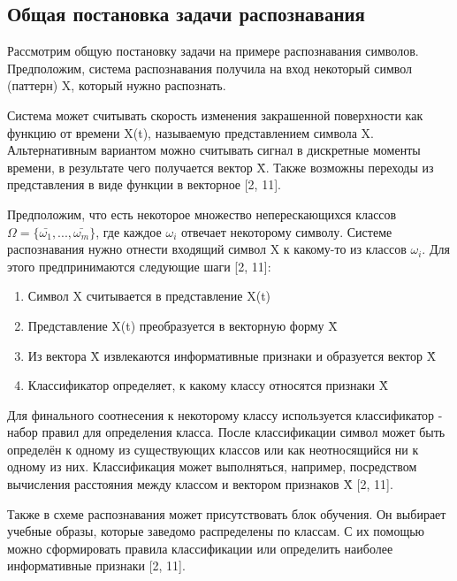 \documentclass[12pt,a4paper]{article}
\begin{document}
\subsection{Общая постановка задачи распознавания}
Рассмотрим общую постановку задачи на примере распознавания символов. Предположим, система распознавания получила на вход некоторый символ (паттерн) X, который нужно распознать.

Система может считывать скорость изменения закрашенной поверхности как функцию от времени X(t), называемую представлением символа X. Альтернативным вариантом можно считывать сигнал в дискретные моменты времени, в результате чего получается вектор \={X}. Также возможны переходы из представления в виде функции в векторное [2, 11].

Предположим, что есть некоторое множество неперескающихся классов $\Omega=\{\bar{\omega_1}, ..., \bar{\omega_m}\}$, где каждое $\omega_i$ отвечает некоторому символу. Системе распознавания нужно отнести входящий символ X к какому-то из классов $\omega_i$. Для этого предпринимаются следующие шаги [2, 11]:
\begin{enumerate}
    \item Символ X считывается в представление X(t)
    \item Представление X(t) преобразуется в векторную форму \=X
    \item Из вектора \=X извлекаются информативные признаки и образуется вектор \^X
    \item Классификатор определяет, к какому классу относятся признаки \^X
\end{enumerate}

Для финального соотнесения к некоторому классу используется классификатор - набор правил для определения класса. После классификации символ может быть определён к одному из существующих классов или как неотносящийся ни к одному из них. Классификация может выполняться, например, посредством вычисления расстояния между классом и вектором признаков \^X [2, 11].

Также в схеме распознавания может присутствовать блок обучения. Он выбирает учебные образы, которые заведомо распределены по классам. С их помощью можно сформировать правила классификации или определить наиболее информативные признаки [2, 11].
\end{document}
